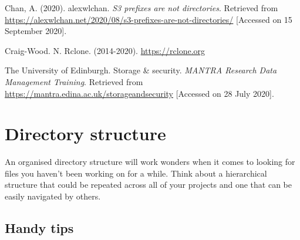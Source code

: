 \documentclass[a4paper,oneside]{report}
\begin{document}
Chan, A. (2020). alexwlchan. \emph{S3 prefixes are not directories}.
Retrieved from
\url{https://alexwlchan.net/2020/08/s3-prefixes-are-not-directories/}
{[}Accessed on 15 September 2020{]}.

Craig-Wood. N. Rclone. (2014-2020). \url{https://rclone.org}

The University of Edinburgh. Storage \& security. \emph{MANTRA Research
Data Management Training}. Retrieved from
\url{https://mantra.edina.ac.uk/storageandsecurity} {[}Accessed on 28
July 2020{]}.

\hypertarget{directory-structure}{%
\chapter{Directory structure}\label{directory-structure}}

An organised directory structure will work wonders when it comes to
looking for files you haven't been working on for a while. Think about a
hierarchical structure that could be repeated across all of your
projects and one that can be easily navigated by others.

\hypertarget{handy-tips}{%
\section{Handy tips}\label{handy-tips}}
\end{document}

